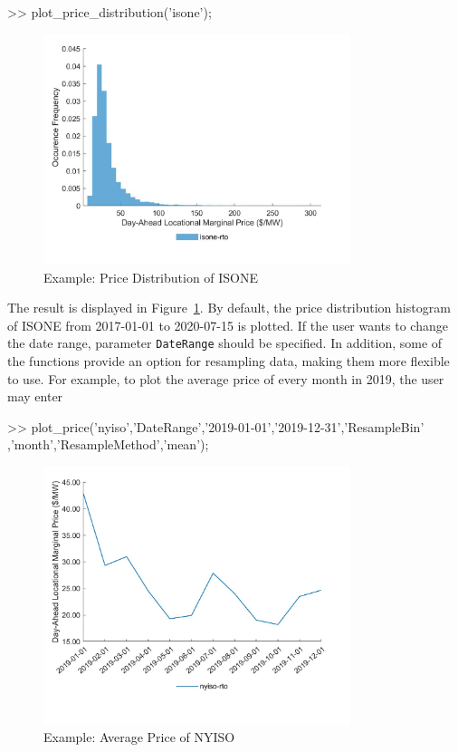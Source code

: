 \documentclass[10pt]{article}
\numberwithin{equation}{section}
\numberwithin{table}{section}
\numberwithin{figure}{section}
\begin{document}
\begin{Code}
>> plot_price_distribution('isone');
\end{Code}

\begin{figure}
  \centering
  \noindent\includegraphics[width=0.8\textwidth]{figures/visualization_example1.jpg}
  \caption{Example: Price Distribution of ISONE} \label{fig:vis_eg1}
\end{figure}

The result is displayed in Figure~\ref{fig:vis_eg1}. By default, the price distribution histogram of ISONE from 2017-01-01 to 2020-07-15 is plotted. If the user wants to change the date range, parameter \verb!DateRange! should be specified. In addition, some of the functions provide an option for resampling data, making them more flexible to use. For example, to plot the average price of every month in 2019, the user may enter

\begin{Code}
 >> plot_price('nyiso','DateRange',{'2019-01-01','2019-12-31'},'ResampleBin'
    ,'month','ResampleMethod','mean');
\end{Code}

\begin{figure}
  \centering
  \noindent\includegraphics[width=0.8\textwidth]{figures/visualization_example2.jpg}
  \caption{Example: Average Price of NYISO} \label{fig:vis_eg2}
\end{figure}
\end{document}
